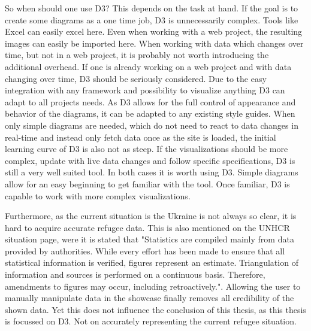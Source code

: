 So when should one use D3? This depends on the task at hand. If the goal is to create some diagrams as a one time job, D3 is unnecessarily complex. Tools like Excel can easily excel here. Even when working with a web project, the resulting images can easily be imported here. When working with data which changes over time, but not in a web project, it is probably not worth introducing the additional overhead. If one is already working on a web project and with data changing over time, D3 should be seriously considered. Due to the easy integration with any framework and possibility to visualize anything D3 can adapt to all projects needs. As D3 allows for the full control of appearance and behavior of the diagrams, it can be adapted to any existing style guides. When only simple diagrams are needed, which do not need to react to data changes in real-time and instead only fetch data once as the site is loaded, the initial learning curve of D3 is also not as steep. If the visualizations should be more complex, update with live data changes and follow specific specifications, D3 is still a very well suited tool. In both cases it is worth using D3. Simple diagrams allow for an easy beginning to get familiar with the tool. Once familiar, D3 is capable to work with more complex visualizations.

Furthermore, as the current situation is the Ukraine is not always so clear, it is hard to acquire accurate refugee data. This is also mentioned on the UNHCR situation page, were it is stated that "Statistics are compiled mainly from data provided by authorities. While every effort has been made to ensure that all statistical information is verified, figures represent an estimate. Triangulation of information and sources is performed on a continuous basis. Therefore, amendments to figures may occur, including retroactively."\cite{unhcr}. Allowing the user to manually manipulate data in the showcase finally removes all credibility of the shown data. Yet this does not influence the conclusion of this thesis, as this thesis is focussed on D3. Not on accurately representing the current refugee situation.